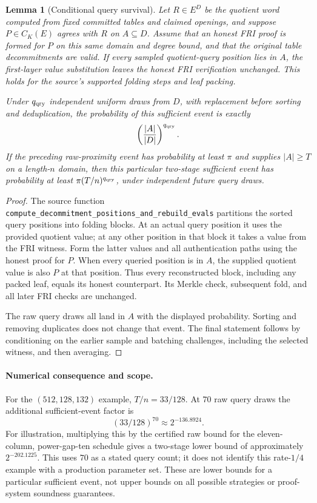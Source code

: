 \documentclass[11pt,letterpaper]{article}
\newtheorem{lemma}[theorem]{Lemma}
\theoremstyle{definition}
\theoremstyle{remark}
\begin{document}
\begin{lemma}[Conditional query survival]
\label{lem:query-survival}
Let $R\in E^D$ be the quotient word computed from fixed committed
tables and claimed openings, and suppose $P\in C_K(E)$ agrees with
$R$ on $A\subseteq D$. Assume that an honest FRI proof is formed for
$P$ on this same domain and degree bound, and that the original table
decommitments are valid. If every sampled quotient-query position lies
in $A$, the first-layer value substitution leaves the honest FRI
verification unchanged. This holds for the source's supported folding
steps and leaf packing.

Under $q_{\rm qry}$ independent uniform draws from $D$, with replacement
before sorting and deduplication, the probability of this sufficient
event is exactly
\[
 \left(\frac{|A|}{|D|}\right)^{q_{\rm qry}}.
\]
If the preceding raw-proximity event has probability at least $\pi$
and supplies $|A|\ge T$ on a length-$n$ domain, then this particular
two-stage sufficient event has probability at least
$\pi(T/n)^{q_{\rm qry}}$, under independent future query draws.
\end{lemma}
\begin{proof}
The source function
\texttt{compute\_decommitment\_positions\_and\_rebuild\_evals}
partitions the sorted query positions into folding blocks. At an actual
query position it uses the provided quotient value; at any other
position in that block it takes a value from the FRI witness. Form the
latter values and all authentication paths using the honest proof for
$P$. When every queried position is in $A$, the supplied quotient
value is also $P$ at that position. Thus every reconstructed block,
including any packed leaf, equals its honest counterpart. Its Merkle
check, subsequent fold, and all later FRI checks are unchanged.

The raw query draws all land in $A$ with the displayed probability.
Sorting and removing duplicates does not change that event. The final
statement follows by conditioning on the earlier sample and batching
challenges, including the selected witness, and then averaging.
\end{proof}

\paragraph{Numerical consequence and scope.}
For the $(512,128,132)$ example, $T/n=33/128$. At $70$ raw query
draws the additional sufficient-event factor is
\[
 (33/128)^{70}\approx2^{-136.8924}.
\]
For illustration, multiplying this by the certified raw bound for the
eleven-column, power-gap-ten schedule gives a two-stage lower bound
of approximately $2^{-202.1225}$. This uses $70$ as a stated query
count; it does not identify this rate-$1/4$ example with a production
parameter set. These are lower bounds for a particular sufficient
event, not upper bounds on all possible strategies or proof-system
soundness guarantees.
\end{document}
